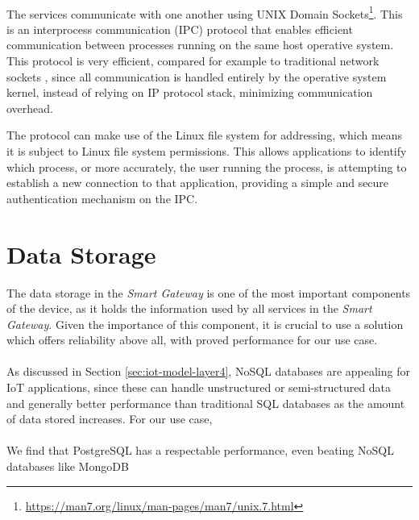 \paragraph{} The services communicate with one another using UNIX Domain Sockets\footnote{\url{https://man7.org/linux/man-pages/man7/unix.7.html}}. This is an interprocess communication (\acs{IPC}) protocol that enables efficient communication between processes running on the same host operative system. This protocol is very efficient, compared for example to traditional network sockets \cite{Wright2007}, since all communication is handled entirely by the operative system kernel, instead of relying on \acs{IP} protocol stack, minimizing communication overhead. 

The protocol can make use of the Linux file system for addressing, which means it is subject to Linux file system permissions. This allows applications to identify which process, or more accurately, the user running the process, is attempting to establish a new connection to that application, providing a simple and secure authentication mechanism on the \acs{IPC}.

\section{Data Storage}

The data storage in the \textit{Smart Gateway} is one of the most important components of the device, as it holds the information used by all services in the \textit{Smart Gateway}. Given the importance of this component, it is crucial to use a solution which offers reliability above all, with proved performance for our use case.  

\paragraph{} As discussed in Section \ref{sec:iot-model-layer4}, No\acs{SQL} databases are appealing for \acs{IoT} applications, since these can handle unstructured or semi-structured data and generally better performance than traditional \acs{SQL} databases as the amount of data stored increases. For our use case, 

\paragraph{}

We find that PostgreSQL has a respectable performance, even beating No\acs{SQL} databases like MongoDB 


